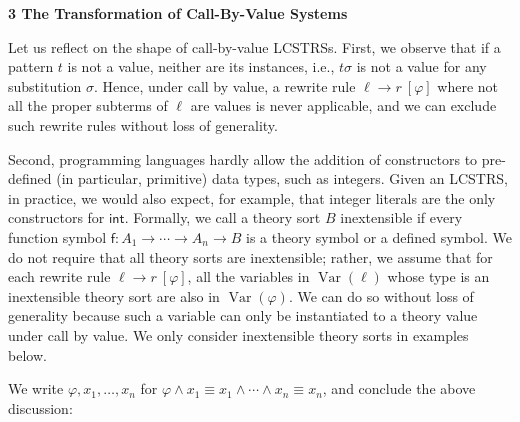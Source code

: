 \documentclass[10pt,a4paper]{amsart}
\begin{document}
 
 
 


 
\par\medskip\noindent\textbf{3 The Transformation of Call-By-Value Systems}\par
 
 
Let us reflect on the shape of call-by-value LCSTRSs. First, we observe that if a pattern $t$ is not a value, neither are its instances, i.e., $t\sigma$ is not a value for any substitution $\sigma$. Hence, under call by value, a rewrite rule ${\ell}\rightarrow{r}\ [\varphi]$ where not all the proper subterms of $\ell$ are values is never applicable, and we can exclude such rewrite rules without loss of generality.\par
 
 
 
Second, programming languages hardly allow the addition of constructors to pre-defined (in particular, primitive) data types, such as integers. Given an LCSTRS, in practice, we would also expect, for example, that integer literals are the only constructors for $\mathsf{int}$. Formally, we call a theory sort $B$ inextensible if every function symbol $\mathsf{f}:{A}_{1}\rightarrow\cdots\rightarrow{A}_{n}\rightarrow B$ is a theory symbol or a defined symbol. We do not require that all theory sorts are inextensible; rather, we assume that for each rewrite rule ${\ell}\rightarrow{r}\ [\varphi]$, all the variables in $\operatorname{Var}(\ell)$ whose type is an inextensible theory sort are also in $\operatorname{Var}(\varphi)$. We can do so without loss of generality because such a variable can only be instantiated to a theory value under call by value. We only consider inextensible theory sorts in examples below.\par
 
 
 
We write $\varphi,{x}_{1},\ldots,{x}_{n}$ for $\varphi\wedge x_{1}\equiv x_{1}\wedge\cdots\wedge x_{n}\equiv x_{n}$, and conclude the above discussion:\par
 
 
 
\end{document}
